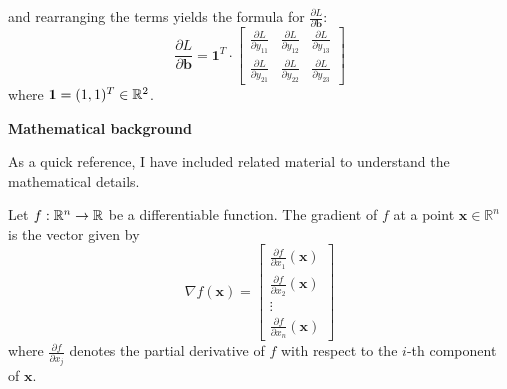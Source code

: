 \documentclass{article}
\begin{document}
and rearranging the terms yields the formula for \(\frac{\partial L}{\partial \mathbf{b}}\):
    \[
        \frac{\partial L}{\partial \mathbf{b}} = 
        \mathbf{1}^T
        \cdot
        \begin{bmatrix}
            \frac{\partial L}{\partial y_{11}} & \frac{\partial L}{\partial y_{12}} & 
            \frac{\partial L}{\partial y_{13}} \\
            \frac{\partial L}{\partial y_{21}} & \frac{\partial L}{\partial y_{22}} & 
            \frac{\partial L}{\partial y_{23}}
        \end{bmatrix}
    \]
where \(\mathbf{1} = (1, 1)^T \in \mathbb{R}^{2}\).

\vspace{0.3cm}
\noindent \large \textbf{Mathematical background}
\vspace{0.3cm}
\normalsize

As a quick reference, I have included related material to understand 
the mathematical details.

\begin{definition*}
    Let \(f : \mathbb{R}^{n} \to \mathbb{R}\) be a differentiable function. The gradient of \(f\) 
    at a point \(\mathbf{x} \in \mathbb{R}^n\) is the vector given by
    \[
        \nabla f(\mathbf{x}) =
        \begin{bmatrix}
            \frac{\partial f}{\partial x_1}(\mathbf{x}) \\
            \frac{\partial f}{\partial x_2}(\mathbf{x}) \\
            \vdots \\
            \frac{\partial f}{\partial x_n}(\mathbf{x})
        \end{bmatrix}
    \]
    where \(\frac{\partial f}{\partial x_j}\) denotes the partial
    derivative of \(f\) with respect to the \(i\)-th component of \(\mathbf{x}\).
\end{definition*}
\end{document}
